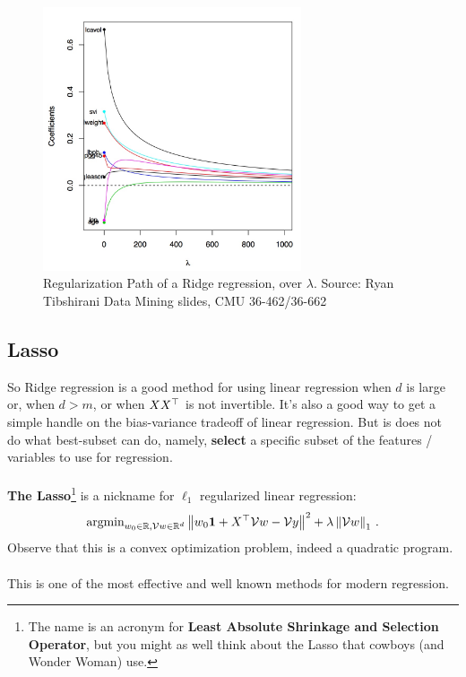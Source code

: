 \begin{figure}[H]
      \centering
      \includegraphics[width=3in]{ridge_path.jpeg}
      \caption{Regularization Path of a Ridge regression, over $\lambda$.
      Source: Ryan Tibshirani Data Mining slides, CMU 36-462/36-662 }
    \end{figure}


\subsection{Lasso}


So Ridge regression is a good method for using linear regression when $d$ is large or,
when $d>m$, or when
$XX^{\top}$ is not invertible. It's also a good way to get a simple handle on the
bias-variance tradeoff of linear regression. But is does not do what best-subset
can do, namely, {\bf select}
a specific subset of the features / variables  to use for regression.
\\~\\
{\bf The Lasso}\footnote{The name is an acronym for {\bf Least Absolute
  Shrinkage and Selection Operator}, but
you might as well think about the Lasso that cowboys (and Wonder Woman) use.}  is a nickname for $\ell_1$ regularized linear regression:
\[
      \text{argmin}_{w_0\in\mathbb{R},\mathcal{V}{w}\in\mathbb{R}^{d}} \left\|  w_0\mathbf{1} + X^{\top}\mathcal{V}{w} -\mathcal{V}{y}  \right\|^2
      +  \lambda \left\| \mathcal{V}{w}\right\|_1\,.
    \]
    Observe that this is a convex optimization problem, indeed a quadratic
    program.
\\~\\
This is 
one of the most effective and well known methods for modern regression. 

